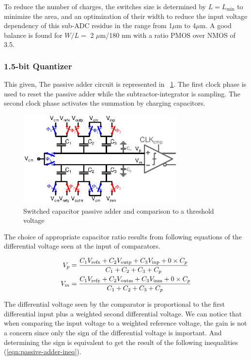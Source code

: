 To reduce the number of charges, the switches size is determined by \(L=L_{\min}\) to minimize the area, and an optimization of their width to reduce the input voltage dependency of this sub-ADC residue in the range from 1\(\mu \)m to 4\(\mu \)m. A good balance is found for \(W/L = \) 2 \(\mu \)m/180 nm with a ratio PMOS over NMOS of 3.5.


	\subsubsection{1.5-bit Quantizer}             %
	\label{sec:isd-3-levels-quantizer}
This given, The passive adder circuit is represented in \figurename~\ref{fig:sc-pacth}. The first clock phase is used to reset the passive adder while the subtractor-integrator is sampling. The second clock phase activates the summation by charging capacitors.

\begin{figure}[htp]
	\centering
	\includegraphics[width=0.75\textwidth]{Chapter4/Figs/isd-passive-adder-comp.ps}
	\caption{Switched capacitor passive adder and comparison to a threshold voltage}
	\label{fig:sc-pacth}
\end{figure}

The choice of appropriate capacitor ratio results from following equations of the differential voltage seen at the input of comparators.

\begin{align}
	V_p &= \frac{C_1V_{\rm refx}+C_2V_{\rm outp}+C_3V_{\rm inp}+0\times C_p}{C_1+C_2+C_3+C_p} \\
	V_m &= \frac{C_1V_{\rm refy}+C_2V_{\rm outm}+C_3V_{\rm inm}+0\times C_p}{C_1+C_2+C_3+C_p}
\end{align}

The differential voltage seen by the comparator is proportional to the first differential input plus a weighted second differential voltage. We can notice that when comparing the input voltage to a weighted reference voltage, the gain is not a concern since only the sign of the differential voltage is important. And determining the sign is equivalent to get the result of the following inequalities (\ref{eqn:passive-adder-ineq}).


